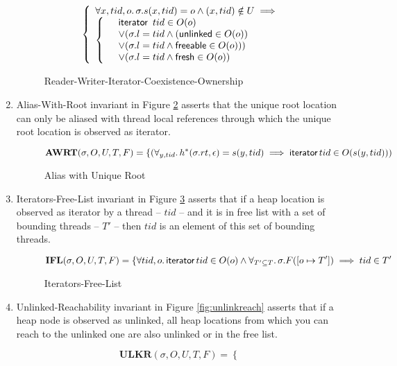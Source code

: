 \begin{enumerate}
\begin{figure}[!htb]
\[\left\{
\begin{array}{ll}
	 \forall x,tid,o \ldotp \sigma.s(x,tid) = o  
         \land (x,tid) \notin U \implies \\ \left\{
		\begin{array}{ll}
 			& \textsf{iterator } \, tid \in O(o) \\
 		  & \lor (\sigma.l=tid \land (\textsf{unlinked} \in O(o) ) \\
		  & \lor (\sigma.l=tid  \land \textsf{freeable} \in O(o)))  \\
       & \lor (\sigma.l=tid \land \textsf{fresh} \in O(o))     
		\end{array}
	\right.%
\end{array}
\right.%
\]
\caption{Reader-Writer-Iterator-Coexistence-Ownership}
\label{fig:rwitrexistence}
\end{figure}
\item{Alias-With-Root} invariant in Figure \ref{fig:aliaswithroot} asserts that the unique root location can only be aliased with thread local references through which the unique root location is observed as \textsf{iterator}.
\begin{figure}[!htb]
\[
\textbf{AWRT}(\sigma,O,U,T,F)=
\left\{
(\forall_{y,tid} \ldotp h^{*}(\sigma.rt,\epsilon) = s(y,tid)  \implies \textsf{iterator}\, tid \in O(s(y,tid)))
	\right.%
\]
\caption{Alias with Unique Root}
\label{fig:aliaswithroot}
\end{figure}
\item{Iterators-Free-List} invariant in Figure \ref{fig:itrfreelist} asserts that if a heap location is observed as \textsf{iterator} by a thread -- $tid$ -- and it is in free list with a set of bounding threads -- $T'$ -- then $tid$ is an element of this set of bounding threads.
\begin{figure}[!htb]
\[
\textbf{IFL}(\sigma,O,U,T,F)=
\left\{
	\forall tid, o \ldotp  \textsf{iterator} \, tid \in O(o)  \land \forall_{T'\subseteq T} \ldotp \sigma.F([o \mapsto T'])  \implies tid \in T' 
\right.%
\]
\caption{Iterators-Free-List}
\label{fig:itrfreelist}
\end{figure}
\item{Unlinked-Reachability} invariant in Figure \ref{fig:unlinkreach} asserts that if a heap node is observed as \textsf{unlinked}, all heap locations from which you can reach to the \textsf{unlinked} one are also unlinked or in the free list.
\begin{figure}[!htb]
\[
\textbf{ULKR}(\sigma,O,U,T,F) =
\left\{
\begin{array}{ll}

\end{array}\]
\end{figure}
\end{enumerate}
